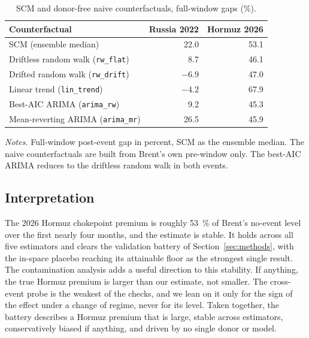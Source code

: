 \begin{table}[h]
\centering
\caption{SCM and donor-free naive counterfactuals, full-window gaps (\%).}
\label{tab:naive}
\begin{threeparttable}
\small
\begin{tabular}{@{}lrr@{}}
\toprule
Counterfactual & Russia 2022 & Hormuz 2026 \\
\midrule
SCM (ensemble median) & 22.0 & 53.1 \\
\addlinespace
Driftless random walk (\texttt{rw\_flat}) & 8.7 & 46.1 \\
Drifted random walk (\texttt{rw\_drift}) & $-6.9$ & 47.0 \\
Linear trend (\texttt{lin\_trend}) & $-4.2$ & 67.9 \\
Best-AIC ARIMA (\texttt{arima\_rw}) & 9.2 & 45.3 \\
Mean-reverting ARIMA (\texttt{arima\_mr}) & 26.5 & 45.9 \\
\bottomrule
\end{tabular}
\begin{tablenotes}[flushleft]
\footnotesize
\item \textit{Notes.} Full-window post-event gap in percent, SCM as the ensemble median. The
naive counterfactuals are built from Brent's own pre-window only. The best-AIC ARIMA reduces
to the driftless random walk in both events.
\end{tablenotes}
\end{threeparttable}
\end{table}

\subsection{Interpretation}
The 2026 Hormuz chokepoint premium is roughly \SI{53}{\percent} of Brent's no-event level
over the first nearly four months, and the estimate is stable. It holds across all
five estimators and clears the validation battery of Section~\ref{sec:methods}, with the
in-space placebo reaching its attainable floor as the strongest single result. The
contamination analysis adds a useful direction to this stability. If anything, the true
Hormuz premium is larger than our estimate, not smaller. The cross-event probe is the
weakest of the checks, and we lean on it only for the sign of the effect under a change of
regime, never for its level. Taken together, the battery describes a Hormuz premium that is
large, stable across estimators, conservatively biased if anything, and driven by no single
donor or model.
